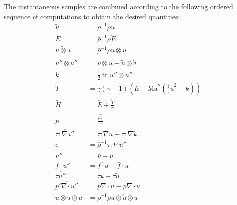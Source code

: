 \documentclass[letterpaper,11pt,nointlimits,reqno,draft]{amsart}
\newcommand{\Mach}[1][]{\ensuremath{\mbox{Ma}_{#1}}}
\DeclareMathOperator{\trace}{tr}
\begin{document}
The instantaneous samples are combined according to the following ordered
sequence of computations to obtain the desired quantities:
{ \allowdisplaybreaks[1]
\begin{align}
  \tilde{u} &= \bar{\rho}^{-1} \overline{\rho{}u}
\\
  \tilde{E} &= \bar{\rho}^{-1} {\overline{\rho{}E}}
\\
  \widetilde{u\otimes{}u} &= \bar{\rho}^{-1} \overline{\rho{}u\otimes{}u}
\\
  \widetilde{u''\otimes{}u''} &=
  \widetilde{u\otimes{}u} - \tilde{u}\otimes\tilde{u}
\\
  k &= \frac{1}{2} \trace \widetilde{u''\otimes{}u''}
\\
  \tilde{T} &= \gamma\left(\gamma-1\right)\left(
      \tilde{E} - \Mach^2\left(\frac{1}{2}\tilde{u}^2 + k\right)
  \right)
\\
  \tilde{H} &= \tilde{E} + \frac{\tilde{T}}{\gamma}
\\
  \bar{p} &= \frac{\bar{\rho}\tilde{T}}{\gamma}
\\
  \overline{\tau:\nabla{}u''} &=
  \overline{\tau:\nabla{}u} - \bar{\tau}:\nabla\tilde{u}
\\
  \epsilon &= \bar{\rho}^{-1} \overline{\tau:\nabla{}u''}
\\
  \overline{u''} &= \bar{u} - \tilde{u}
\\
  \overline{f\cdot{}u''} &= \overline{f\cdot{}u} - \bar{f}\cdot{}\tilde{u}
\\
  \overline{\tau{}u''} &= \overline{\tau{}u} - \bar{\tau}\tilde{u}
\\
  \overline{p'\nabla\cdot{}u''}
  &= \overline{p\nabla\cdot{}u}
   - \bar{p}\nabla\cdot\bar{u}
\\
  \widetilde{u\otimes{}u\otimes{}u}
  &= \bar{\rho}^{-1} \overline{\rho{}u\otimes{}u\otimes{}u}
\end{align}
}
\end{document}
